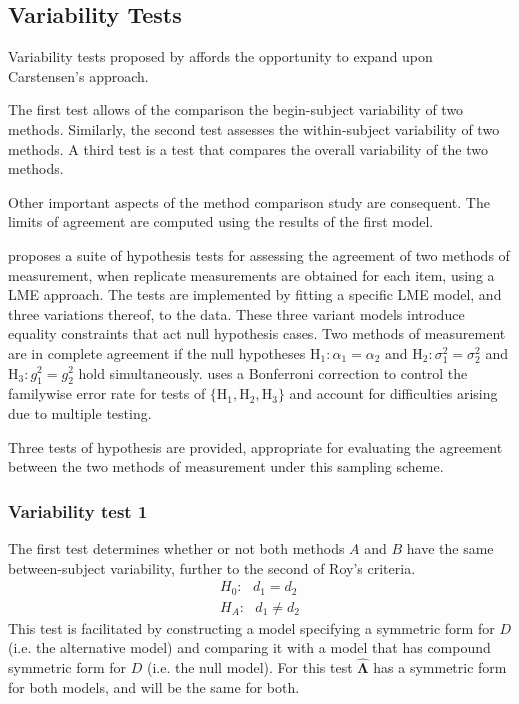 \documentclass[12pt, a4paper]{report}
\theoremstyle{plain}
\theoremstyle{definition}
\theoremstyle{remark}
\begin{document}
	
	
	
	
	
	
	
	\subsection{Variability Tests}
	
		Variability tests proposed by \citet{ARoy2009} affords the opportunity to expand upon Carstensen's approach.
		
		The first test allows of the comparison the begin-subject variability of two methods. Similarly, the second test
		assesses the within-subject variability of two methods. A third test is a test that compares the overall variability of the two methods.
		
		Other important aspects of the method comparison study are consequent. The limits of agreement are computed using the results of the first model.
		
		\citet{ARoy2009} proposes a suite of hypothesis tests for assessing the agreement of two methods of measurement, when replicate measurements are obtained for each item, using a LME approach. The tests are implemented by fitting a specific LME model, and three variations thereof, to the data. These three variant models introduce equality constraints that act null hypothesis cases.
		Two methods of measurement are in complete agreement if the null hypotheses $\mathrm{H}_1\colon \alpha_1 = \alpha_2$ and $\mathrm{H}_2\colon \sigma^2_1 = \sigma^2_2 $ and $\mathrm{H}_3\colon g^2_1= g^2_2$ hold simultaneously. \citet{ARoy2009} uses a Bonferroni correction to control the familywise error rate for tests of $\{\mathrm{H}_1, \mathrm{H}_2, \mathrm{H}_3\}$ and account for difficulties arising due to multiple testing. 
		
		
		Three tests of hypothesis are provided, appropriate for evaluating the agreement between the two methods of measurement under this sampling scheme. 
		
		
	
	

	

	\subsubsection{Variability test 1}
	The first test determines whether or not both methods $A$ and $B$ have the same between-subject variability, further to the second of Roy's criteria.
	\begin{eqnarray*}
		H_{0}: \mbox{ }d_{1}  = d_{2} \\
		H_{A}: \mbox{ }d_{1}  \neq d_{2}
	\end{eqnarray*}
	This test is facilitated by constructing a model specifying a symmetric form for $D$ (i.e. the alternative model) and comparing it with a model that has compound symmetric form for $D$ (i.e. the null model). For this test $\boldsymbol{\hat{\Lambda}}$ has a symmetric form for both models, and will be the same for both.
	
\end{document}
